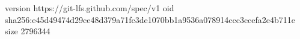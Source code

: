 version https://git-lfs.github.com/spec/v1
oid sha256:e45d49474d29ce48d379a71fc3de1070bb1a9536a078914ccc3ccefa2e4b711e
size 2796344
